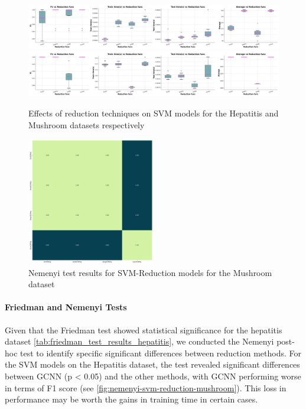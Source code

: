 \begin{figure}
    \centering
    \includegraphics[width=\textwidth]{figures/SVM_reduction_effects_hepatitis.png}
    \includegraphics[width=\textwidth]{figures/SVM_reduction_effects_mushroom.png}
    \caption{Effects of reduction techniques on SVM models for the Hepatitis and Mushroom datasets respectively}
    \label{fig:SVM-reduction-effects}
\end{figure}

\begin{figure}
    \centering
    \includegraphics[width=0.5\textwidth]{figures/nemenyi_test_results_SVM_Reduction_mushroom.png}
    \caption{Nemenyi test results for SVM-Reduction models for the Mushroom dataset}
    \label{fig:nemenyi-svm-reduction-mushroom}
\end{figure}




\paragraph{Friedman and Nemenyi Tests} Given that the Friedman test showed statistical significance for the hepatitis dataset \autoref{tab:friedman_test_results_hepatitis}, we conducted the Nemenyi post-hoc test to identify specific significant differences between reduction methods. 
For the SVM models on the Hepatitis dataset, the test revealed significant differences between GCNN (p < 0.05) and the other methods, with GCNN performing worse in terms of F1 score (see \autoref{fig:nemenyi-svm-reduction-mushroom}).
This loss in performance may be worth the gains in training time in certain cases.

